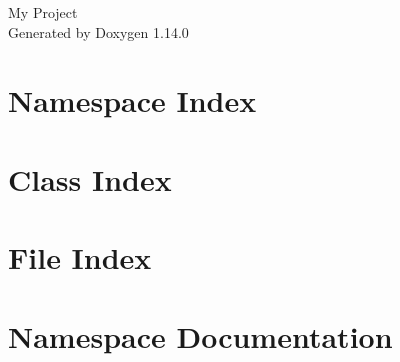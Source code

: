 \documentclass[twoside]{book}
\newcommand{\+}{\discretionary{\mbox{\scriptsize$\hookleftarrow$}}{}{}}
\newcommand{\clearemptydoublepage}{%
    \newpage{\pagestyle{empty}\cleardoublepage}%
  }
\begin{document}
  \raggedbottom
    \hypersetup{pageanchor=false,
                bookmarksnumbered=true,
                pdfencoding=unicode
               }
  \begin{titlepage}
  \vspace*{7cm}
  \begin{center}%
  {\Large My Project}\\
  \vspace*{1cm}
  {\large Generated by Doxygen 1.14.0}\\
  \end{center}
  \end{titlepage}
  \clearemptydoublepage
  \tableofcontents
  \clearemptydoublepage
  \hypersetup{pageanchor=true}
\chapter{Namespace Index}

\chapter{Class Index}

\chapter{File Index}

\chapter{Namespace Documentation}




\end{document}
